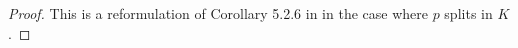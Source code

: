 \documentclass[10pt,letterpaper]{amsart}
\theoremstyle{plain}
\theoremstyle{definition}
\theoremstyle{definition}
\theoremstyle{plain}
\theoremstyle{plain}
\theoremstyle{plain}
\theoremstyle{remark}
\numberwithin{equation}{section}
\newcommand{\Z}{\mathbf{Z}}
\begin{document}
\begin{proof}
This is a reformulation of  Corollary 5.2.6 in \cite{LLZ-K} in the case where $p$ splits in $K$. 

\end{proof}
\end{document}
